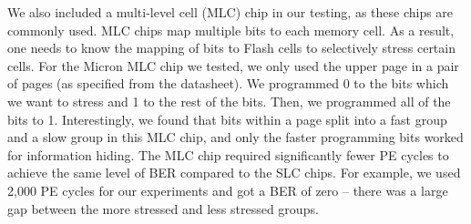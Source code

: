 We also included a multi-level cell (MLC) chip in our testing, 
as these chips are commonly used. 
MLC chips map multiple bits to each memory cell. As a result, one needs to
know the mapping of bits to Flash cells to selectively stress certain cells.
For the Micron MLC chip we
tested, we only used the upper page in a pair of pages (as specified from the datasheet).
We programmed 0 to the bits which we want to stress and 1 to the rest of the bits.
Then, we programmed all of the bits to 1. Interestingly, we found that bits within 
a page split into a fast group and a slow group in this MLC chip, and only the faster programming
bits worked for information hiding. 
The MLC chip required significantly fewer PE cycles to achieve the same level of BER 
compared to the SLC chips. For example, we used 2,000 PE cycles for our experiments
and got a BER of zero -- there was a large gap between the more stressed and less stressed
groups. 



